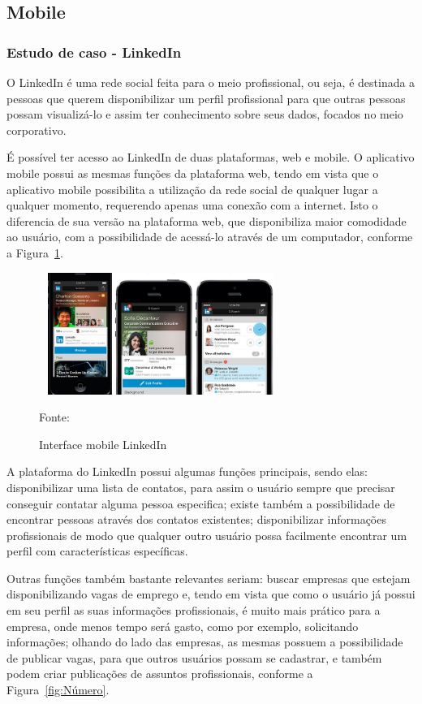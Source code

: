 \subsection{Mobile}


\subsubsection{Estudo de caso - LinkedIn}

O LinkedIn é uma rede social feita para o meio profissional, ou seja, é destinada a pessoas que querem disponibilizar um perfil profissional para que outras pessoas possam visualizá-lo e assim ter conhecimento sobre seus dados, focados no meio corporativo.

É possível ter acesso ao LinkedIn de duas plataformas, web e mobile. O aplicativo mobile possui as mesmas funções da plataforma web, tendo em vista que o aplicativo mobile possibilita a utilização da rede social de qualquer lugar a qualquer momento, requerendo apenas uma conexão com a internet. Isto o diferencia de sua versão na plataforma web, que disponibiliza maior comodidade ao usuário, com a possibilidade de acessá-lo através de um computador, conforme a Figura~\hypersetup{linkcolor=black}\ref{fig:mobile}.

\begin{figure}[!h]
	\centering
		
	\caption{Interface mobile LinkedIn}
	\includegraphics[width=300px, height=150px]{./images/linkedinMobile.png}
		\label{fig:mobile}
	\par {Fonte: \cite{linkedin-b}}
\end{figure}
\newpage
A plataforma do LinkedIn possui algumas funções principais, sendo elas: disponibilizar uma lista de contatos, para assim o usuário sempre que precisar conseguir contatar alguma pessoa especifica; existe também a possibilidade de encontrar pessoas através dos contatos existentes; disponibilizar informações profissionais de modo que qualquer outro usuário possa facilmente encontrar um perfil com características específicas.

Outras funções também bastante relevantes seriam: buscar empresas que estejam disponibilizando vagas de emprego e, tendo em vista que como o usuário já possui em seu perfil as suas informações profissionais, é muito mais prático para a empresa, onde menos tempo será gasto, como por exemplo, solicitando informações; olhando do lado das empresas, as mesmas possuem a possibilidade de publicar vagas, para que outros usuários possam se cadastrar, e também podem criar publicações de assuntos profissionais, conforme a Figura~\hypersetup{linkcolor=black}\ref{fig:Número}.

